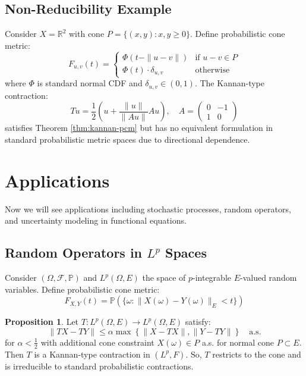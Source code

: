 \documentclass{amsart}
\theoremstyle{definition}
\newtheorem{proposition}[theorem]{Proposition}
\theoremstyle{remark}
\numberwithin{equation}{section}
\begin{document}
\subsection{Non-Reducibility Example}
Consider $X = \mathbb{R}^2$ with cone $P = \{ (x,y) : x,y \geq 0 \}$. Define probabilistic cone metric:
\[
F_{u,v}(t) = \begin{cases} 
\Phi(t - \|u-v\|) & \text{if } u-v \in P \\
\Phi(t) \cdot \delta_{u,v} & \text{otherwise}
\end{cases}
\]
where $\Phi$ is standard normal CDF and $\delta_{u,v} \in (0,1)$. The Kannan-type contraction:
\[
Tu = \frac{1}{2} \left( u + \frac{\|u\|}{\|Au\|} Au \right), \quad A = \begin{pmatrix} 0 & -1 \\ 1 & 0 \end{pmatrix}
\]
satisfies Theorem \ref{thm:kannan-pcm} but has no equivalent formulation in standard probabilistic metric spaces due to directional dependence.

\section{Applications}
Now we will see applications including stochastic processes, random operators, and uncertainty modeling in functional equations.
\subsection{Random Operators in $L^p$ Spaces}

Consider $(\Omega,\mathcal{F},\mathbb{P})$ and $L^p(\Omega,E)$ the space of $p$-integrable $E$-valued random variables. Define probabilistic cone metric:
\[
F_{X,Y}(t) = \mathbb{P}\left(\{\omega : \|X(\omega) - Y(\omega)\|_E < t\}\right)
\]

\begin{proposition}\label{prop:random}
Let $T: L^p(\Omega,E) \to L^p(\Omega,E)$ satisfy:
\[
\|TX - TY\| \leq \alpha \max\left\{ \|X - TX\|, \|Y - TY\| \right\} \quad \text{a.s.}
\]
for $\alpha < \frac{1}{2}$ with additional cone constraint $X(\omega) \in P$ a.s. for normal cone $P \subset E$. Then $T$ is a Kannan-type contraction in $(L^p,F)$. So, $T$ restricts to the cone and is irreducible to standard probabilistic contractions. 
\end{proposition}
\end{document}
